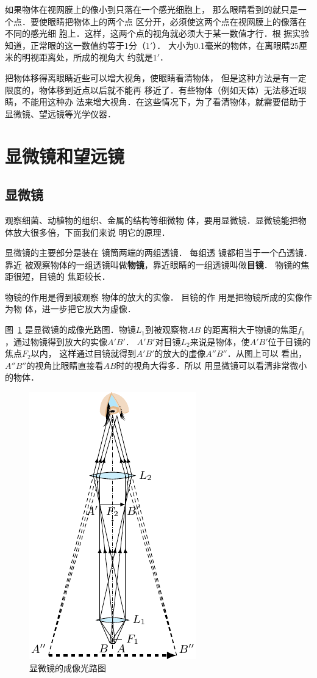 如果物体在视网膜上的像小到只落在一个感光细胞上，
那么眼睛看到的就只是一个点．要使眼睛把物体上的两个点
区分开，必须使这两个点在视网膜上的像落在不同的感光细
胞上．这样，这两个点的视角就必须大于某一数值才行．根
据实验知道，正常眼的这一数值约等于1分（$1'$）．
大小为0.1毫米的物体，在离眼睛25厘米的明视距离处，所成的视角大
约就是$1'$．

把物体移得离眼睛近些可以增大视角，使眼睛看清物体，
但是这种方法是有一定限度的，物体移到近点以后就不能再
移近了．有些物体（例如天体）无法移近眼睛，不能用这种办
法来增大视角．在这些情况下，为了看清物体，就需要借助于
显微镜、望远镜等光学仪器．

\section{显微镜和望远镜}
\subsection{显微镜}

观察细菌、动植物的组织、金属的结构等细微物
体，要用显微镜．显微镜能把物体放大很多倍，下面我们来说
明它的原理．

显微镜的主要部分是装在
镜筒两端的两组透镜．
每组透
镜都相当于一个凸透镜．靠近
被观察物体的一组透镜叫做\textbf{物镜}，靠近眼睛的一组透镜叫做\textbf{目镜}．
物镜的焦距很短，目镜的
焦距较长．

物镜的作用是得到被观察
物体的放大的实像．
目镜的作
用是把物镜所成的实像作为物
体，进一步把它放大为虚像．



图~\ref{fig_C_5-53} 是显微镜的成像光路图．物镜$L_1$到被观察物$AB$
的距离稍大于物镜的焦距$f_1$，通过物镜得到放大的实像$A'B'$．
$A'B'$对目镜$L_2$来说是物体，使$A'B'$位于目镜的焦点$F_2$以内，
这样通过目镜就得到$A'B'$的放大的虚像$A''B''$．从图上可以
看出，$A''B''$的视角比眼睛直接看$AB$时的视角大得多．所以
用显微镜可以看清非常微小的物体．

\begin{figure}[htbp]
	\centering
	\includegraphics{fig/C/5-53.pdf}
	\caption{显微镜的成像光路图}\label{fig_C_5-53}
\end{figure}


